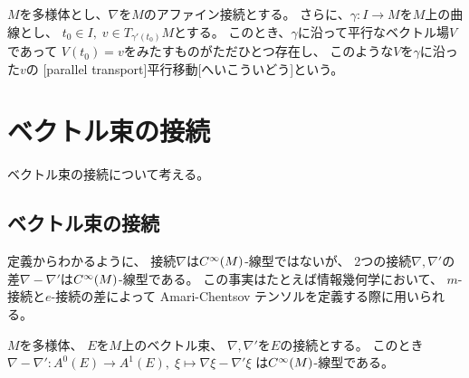 \documentclass[report]{jlreq}
\begin{document}
\begin{definition}[平行移動]
    $M$を多様体とし、$\nabla$を$M$のアファイン接続とする。
    さらに、$\gamma \colon I \to M$を$M$上の曲線とし、
    $t_0 \in I,\; v \in T_{\gamma'(t_0)} M$とする。
    このとき、$\gamma$に沿って平行なベクトル場$V$であって
    $V(t_0) = v$をみたすものがただひとつ存在し、
    このような$V$を$\gamma$に沿った$v$の
    [parallel transport]{平行移動}[へいこういどう]という。
\end{definition}




%
\chapter{ベクトル束の接続}

ベクトル束の接続について考える。

%
\section{ベクトル束の接続}


定義からわかるように、
接続$\nabla$は$C^\infty(M)$-線型ではないが、
2つの接続$\nabla, \nabla'$の差$\nabla - \nabla'$は$C^\infty(M)$-線型である。
この事実はたとえば情報幾何学において、
$m$-接続と$e$-接続の差によって Amari-Chentsov テンソルを定義する際に用いられる。

\begin{proposition}
    $M$を多様体、
    $E$を$M$上のベクトル束、
    $\nabla, \nabla'$を$E$の接続とする。
    このとき
    $\nabla - \nabla' \colon A^0(E) \to A^1(E), \;
        \xi \mapsto \nabla\xi - \nabla'\xi$
    は$C^\infty(M)$-線型である。
\end{proposition}
\end{document}
